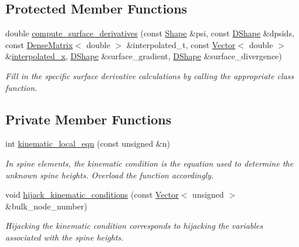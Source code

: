 \subsection*{Protected Member Functions}
\begin{DoxyCompactItemize}
\item 
double \hyperlink{classoomph_1_1SpineUpdateFluidInterfaceElement_a75debcd348674d5ea58bfefc0e72b737}{compute\+\_\+surface\+\_\+derivatives} (const \hyperlink{classoomph_1_1Shape}{Shape} \&psi, const \hyperlink{classoomph_1_1DShape}{D\+Shape} \&dpsids, const \hyperlink{classoomph_1_1DenseMatrix}{Dense\+Matrix}$<$ double $>$ \&interpolated\+\_\+t, const \hyperlink{classoomph_1_1Vector}{Vector}$<$ double $>$ \&\hyperlink{classoomph_1_1FiniteElement_a5a9c1ead9819cd17603096e63087020f}{interpolated\+\_\+x}, \hyperlink{classoomph_1_1DShape}{D\+Shape} \&surface\+\_\+gradient, \hyperlink{classoomph_1_1DShape}{D\+Shape} \&surface\+\_\+divergence)
\begin{DoxyCompactList}\small\item\em Fill in the specific surface derivative calculations by calling the appropriate class function. \end{DoxyCompactList}\end{DoxyCompactItemize}
\subsection*{Private Member Functions}
\begin{DoxyCompactItemize}
\item 
int \hyperlink{classoomph_1_1SpineUpdateFluidInterfaceElement_a94f737e046cb2796cb2b2dd5534bd3cd}{kinematic\+\_\+local\+\_\+eqn} (const unsigned \&n)
\begin{DoxyCompactList}\small\item\em In spine elements, the kinematic condition is the equation used to determine the unknown spine heights. Overload the function accordingly. \end{DoxyCompactList}\item 
void \hyperlink{classoomph_1_1SpineUpdateFluidInterfaceElement_aafe4d848b76bb62c987bdb9852c117bb}{hijack\+\_\+kinematic\+\_\+conditions} (const \hyperlink{classoomph_1_1Vector}{Vector}$<$ unsigned $>$ \&bulk\+\_\+node\+\_\+number)
\begin{DoxyCompactList}\small\item\em Hijacking the kinematic condition corresponds to hijacking the variables associated with the spine heights. \end{DoxyCompactList}\end{DoxyCompactItemize}
